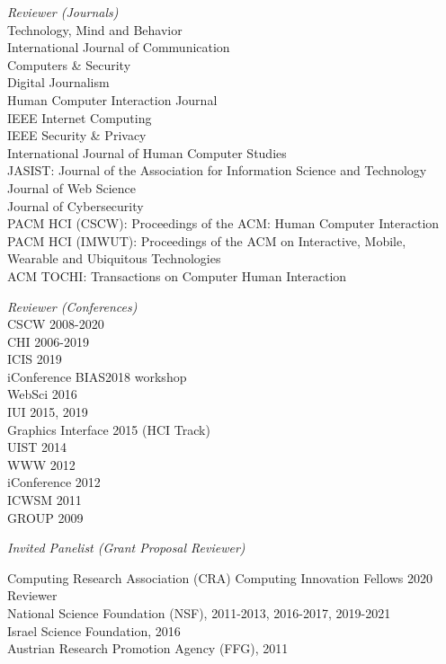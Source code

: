 \documentclass[9pt]{extarticle}
\begin{document}
\emph{Reviewer (Journals)} \\
\vspace{1pt}
Technology, Mind and Behavior \\
International Journal of Communication \\
Computers \& Security \\ 
Digital Journalism \\
Human Computer Interaction Journal \\
IEEE Internet Computing \\
IEEE Security \& Privacy \\
International Journal of Human Computer Studies \\
JASIST: Journal of the Association for Information Science and Technology \\
Journal of Web Science \\
Journal of Cybersecurity \\ 
PACM HCI (CSCW): Proceedings of the ACM: Human Computer Interaction \\
PACM HCI (IMWUT): Proceedings of the ACM on Interactive, Mobile, Wearable and Ubiquitous Technologies \\ 
ACM TOCHI: Transactions on Computer Human Interaction


\emph{Reviewer (Conferences)} \\
\vspace{1pt}
CSCW 2008-2020 \\
CHI 2006-2019 \\
ICIS 2019 \\
iConference BIAS2018 workshop \\
WebSci 2016 \\
IUI 2015, 2019 \\
Graphics Interface 2015 (HCI Track) \\
UIST 2014 \\
WWW 2012 \\
iConference 2012 \\
ICWSM 2011 \\
GROUP 2009

\emph{Invited Panelist (Grant Proposal Reviewer)} \\
\vspace{1pt}

Computing Research Association (CRA) Computing Innovation Fellows 2020 Reviewer \\
National Science Foundation (NSF), 2011-2013, 2016-2017, 2019-2021 \\
Israel Science Foundation, 2016 \\
Austrian Research Promotion Agency (FFG), 2011
\end{document}
